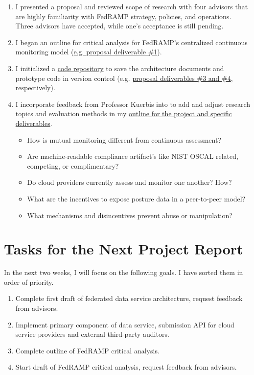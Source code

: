 \documentclass{jdf}
\begin{document}
\begin{enumerate}
    \item I presented a proposal and reviewed scope of research with four advisors that are highly familiarity with FedRAMP strategy, policies, and operations. Three advisors have accepted, while one's acceptance is still pending.
    \item I began an outline for critical analysis for FedRAMP's centralized continuous monitoring model (\hyperlink{https://github.com/aj-stein/practicum_proposal/blob/main/paper.pdf}{e.g. proposal deliverable \#1}).
    \item I initialized a \hyperlink{https://github.com/aj-stein/conmotion.git}{code repository} to save the architecture documents and prototype code in version control (e.g. \hyperlink{https://github.com/aj-stein/practicum_proposal/blob/main/paper.pdf}{proposal deliverables \#3 and \#4}, respectively).
    \item I incorporate feedback from Professor Kuerbis into to add and adjust research topics and evaluation methods in my \hyperlink{https://github.com/aj-stein/practicum/blob/main/notes.pdf}{outline for the project and specific deliverables}.
    \begin{itemize}
        \item How is mutual monitoring different from continuous assessment?
        \item Are machine-readable compliance artifact's like NIST OSCAL related, competing, or complimentary?
        \item Do cloud providers currently assess and monitor one another? How?
        \item What are the incentives to expose posture data in a peer-to-peer model?
        \item What mechanisms and disincentives prevent abuse or manipulation?
    \end{itemize}
\end{enumerate}

\section*{Tasks for the Next Project Report}

In the next two weeks, I will focus on the following goals. I have sorted them in order of priority.

\begin{enumerate}
    \item Complete first draft of federated data service architecture, request feedback from advisors.
    \item Implement primary component of data service, submission API for cloud service providers and external third-party auditors.
    \item Complete outline of FedRAMP critical analysis.
    \item Start draft of FedRAMP critical analysis, request feedback from advisors.
\end{enumerate}
\end{document}
